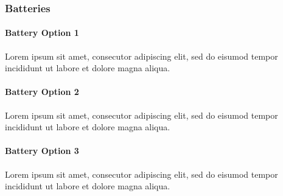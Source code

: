 \documentclass[3p]{elsarticle}
\begin{document}
\subsubsection{Batteries}

\paragraph{Battery Option 1}
Lorem ipsum sit amet, consecutor adipiscing elit, sed do eisumod tempor incididunt ut labore et dolore magna aliqua.
\paragraph{Battery Option 2}
Lorem ipsum sit amet, consecutor adipiscing elit, sed do eisumod tempor incididunt ut labore et dolore magna aliqua.
\paragraph{Battery Option 3}
Lorem ipsum sit amet, consecutor adipiscing elit, sed do eisumod tempor incididunt ut labore et dolore magna aliqua.
\end{document}
